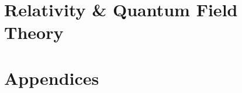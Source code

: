 \documentclass[12pt, a4paper]{report}
\begin{document}
\part{Relativity \& Quantum Field Theory}











\part{Appendices}
\begin{appendices}


\end{appendices}


\printnomenclature




\printindex
\end{document}
